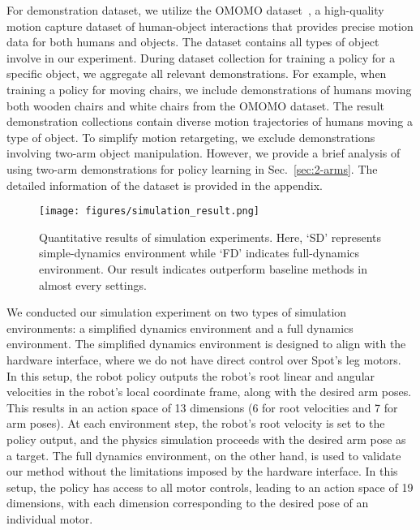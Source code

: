 For demonstration dataset, we utilize the OMOMO dataset~\citep{OMOMO}, a high-quality motion capture dataset of human-object interactions that provides precise motion data for both humans and objects. The dataset contains all types of object involve in our experiment. During dataset collection for training a policy for a specific object, we aggregate all relevant demonstrations. For example, when training a policy for moving chairs, we include demonstrations of humans moving both wooden chairs and white chairs from the OMOMO dataset. The result demonstration collections contain diverse motion trajectories of humans moving a type of object. To simplify motion retargeting, we exclude demonstrations involving two-arm object manipulation. However, we provide a brief analysis of using two-arm demonstrations for policy learning in Sec.~\ref{sec:2-arms}. The detailed information of the dataset is provided in the appendix.


 
\begin{figure*}[t]
 \centering


\texttt{[image: figures/simulation\_result.png]}
\caption{Quantitative results of simulation experiments. Here, `SD' represents simple-dynamics environment while `FD' indicates full-dynamics environment. Our result indicates \textbf{\method} outperform baseline methods in almost every settings.
}
\vspace{-0.5cm}
\label{fig:simulation_barplot}
\end{figure*}




 We conducted our simulation experiment on two types of simulation environments: a simplified dynamics environment and a full dynamics environment. The simplified dynamics environment is designed to align with the hardware interface, where we do not have direct control over Spot's leg motors. In this setup, the robot policy outputs the robot's root linear and angular velocities in the robot’s local coordinate frame, along with the desired arm poses. This results in an action space of 13 dimensions (6 for root velocities and 7 for arm poses). At each environment step, the robot's root velocity is set to the policy output, and the physics simulation proceeds with the desired arm pose as a target. The full dynamics environment, on the other hand, is used to validate our method without the limitations imposed by the hardware interface. In this setup, the policy has access to all motor controls, leading to an action space of 19 dimensions, with each dimension corresponding to the desired pose of an individual motor. 





